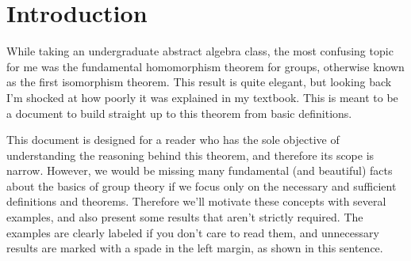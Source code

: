 \section{Introduction}

While taking an undergraduate abstract algebra class, the most confusing topic for me was the fundamental homomorphism theorem for groups, otherwise known as the first isomorphism theorem. This result is quite elegant, but looking back I'm shocked at how poorly it was explained in my textbook. This is meant to be a document to build straight up to this theorem from basic definitions.

This document is designed for a reader who has the sole objective of understanding the reasoning behind this theorem, and therefore its scope is narrow. However, we would be missing many fundamental (and beautiful) facts about the basics of  group theory if we focus only on the necessary and sufficient definitions and theorems. Therefore we'll motivate these concepts with several examples, and also present some results that aren't strictly required. \extra The examples are clearly labeled if you don't care to read them, and unnecessary results are marked with a spade in the left margin, as shown in this sentence.